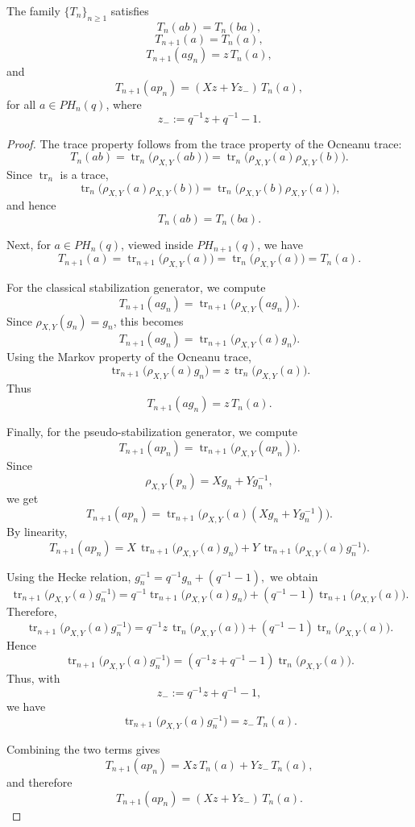 \documentclass[10pt,a4paper]{amsart}
\begin{document}
\begin{proposition}
The family \(\{T_n\}_{n\geq 1}\) satisfies
\[
T_n(ab)=T_n(ba),
\]
\[
T_{n+1}(a)=T_n(a),
\]
\[
T_{n+1}(a g_n)=z\,T_n(a),
\]
and
\[
T_{n+1}(a p_n)=(Xz+Yz_-)\,T_n(a),
\]
for all \(a\in PH_n(q)\), where
\[
z_-:=q^{-1}z+q^{-1}-1.
\]
\end{proposition}

\begin{proof}
The trace property follows from the trace property of the Ocneanu trace:
\[
T_n(ab)
=
\operatorname{tr}_n\big(\rho_{X,Y}(ab)\big)
=
\operatorname{tr}_n\big(\rho_{X,Y}(a)\rho_{X,Y}(b)\big).
\]
Since \(\operatorname{tr}_n\) is a trace,
\[
\operatorname{tr}_n\big(\rho_{X,Y}(a)\rho_{X,Y}(b)\big)
=
\operatorname{tr}_n\big(\rho_{X,Y}(b)\rho_{X,Y}(a)\big),
\]
and hence
\[
T_n(ab)=T_n(ba).
\]

\noindent Next, for \(a\in PH_n(q)\), viewed inside \(PH_{n+1}(q)\), we have
\[
T_{n+1}(a)
=
\operatorname{tr}_{n+1}\big(\rho_{X,Y}(a)\big)
=
\operatorname{tr}_n\big(\rho_{X,Y}(a)\big)
=
T_n(a).
\]

\noindent For the classical stabilization generator, we compute
\[
T_{n+1}(a g_n)
=
\operatorname{tr}_{n+1}\big(\rho_{X,Y}(a g_n)\big).
\]
Since \(\rho_{X,Y}(g_n)=g_n\), this becomes
\[
T_{n+1}(a g_n)
=
\operatorname{tr}_{n+1}\big(\rho_{X,Y}(a)g_n\big).
\]
Using the Markov property of the Ocneanu trace,
\[
\operatorname{tr}_{n+1}\big(\rho_{X,Y}(a)g_n\big)
=
z\,\operatorname{tr}_n\big(\rho_{X,Y}(a)\big).
\]
Thus
\[
T_{n+1}(a g_n)=z\,T_n(a).
\]

Finally, for the pseudo-stabilization generator, we compute
\[
T_{n+1}(a p_n)
=
\operatorname{tr}_{n+1}\big(\rho_{X,Y}(a p_n)\big).
\]
Since
\[
\rho_{X,Y}(p_n)=Xg_n+Yg_n^{-1},
\]
we get
\[
T_{n+1}(a p_n)
=
\operatorname{tr}_{n+1}\big(\rho_{X,Y}(a)(Xg_n+Yg_n^{-1})\big).
\]
By linearity,
\[
T_{n+1}(a p_n)
=
X\,\operatorname{tr}_{n+1}\big(\rho_{X,Y}(a)g_n\big)
+
Y\,\operatorname{tr}_{n+1}\big(\rho_{X,Y}(a)g_n^{-1}\big).
\]

\noindent Using the Hecke relation, \(g_n^{-1}=q^{-1}g_n+(q^{-1}-1),\) we obtain
\[
\operatorname{tr}_{n+1}\big(\rho_{X,Y}(a)g_n^{-1}\big)
=
q^{-1}\operatorname{tr}_{n+1}\big(\rho_{X,Y}(a)g_n\big)
+
(q^{-1}-1)\operatorname{tr}_{n+1}\big(\rho_{X,Y}(a)\big).
\]
Therefore,
\[
\operatorname{tr}_{n+1}\big(\rho_{X,Y}(a)g_n^{-1}\big)
=
q^{-1}z\,\operatorname{tr}_n\big(\rho_{X,Y}(a)\big)
+
(q^{-1}-1)\operatorname{tr}_n\big(\rho_{X,Y}(a)\big).
\]
Hence
\[
\operatorname{tr}_{n+1}\big(\rho_{X,Y}(a)g_n^{-1}\big)
=
\left(q^{-1}z+q^{-1}-1\right)
\operatorname{tr}_n\big(\rho_{X,Y}(a)\big).
\]
Thus, with
\[
z_-:=q^{-1}z+q^{-1}-1,
\]
we have
\[
\operatorname{tr}_{n+1}\big(\rho_{X,Y}(a)g_n^{-1}\big)
=
z_-\,T_n(a).
\]

Combining the two terms gives
\[
T_{n+1}(a p_n)
=
Xz\,T_n(a)+Yz_-\,T_n(a),
\]
and therefore
\[
T_{n+1}(a p_n)
=
(Xz+Yz_-)\,T_n(a).
\]
\end{proof}
\end{document}
